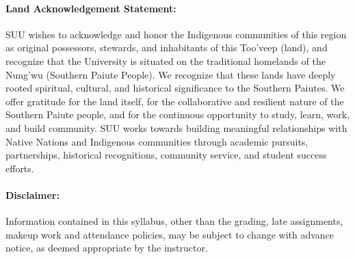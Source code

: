 \documentclass[12pt, letterpaper]{article}
\begin{document}
\paragraph{Land Acknowledgement Statement:}
SUU wishes to acknowledge and honor the Indigenous communities of this region as original possessors, stewards, and inhabitants of this Too’veep (land), and recognize that the University is situated on the traditional homelands of the Nung’wu (Southern Paiute People). We recognize that these lands have deeply rooted spiritual, cultural, and historical significance to the Southern Paiutes. We offer gratitude for the land itself, for the collaborative and resilient nature of the Southern Paiute people, and for the continuous opportunity to study, learn, work, and build community. SUU works towards building meaningful relationships with Native Nations and Indigenous communities through academic pursuits, partnerships, historical recognitions, community service, and student success efforts.

\paragraph{Disclaimer:}
Information contained in this syllabus, other than the grading, late assignments, makeup work and attendance policies, may be subject to change with advance notice, as deemed appropriate by the instructor.
\end{document}
